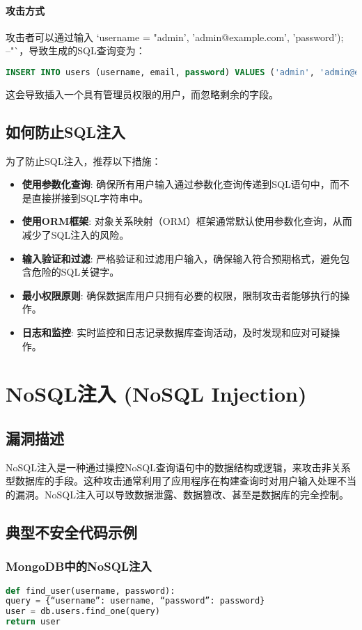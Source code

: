 \documentclass{article}
\begin{document}
\paragraph{攻击方式}
攻击者可以通过输入 `username = "admin', 'admin@example.com', 'password'); --"`，导致生成的SQL查询变为：
\begin{lstlisting}[language=SQL]
INSERT INTO users (username, email, password) VALUES ('admin', 'admin@example.com', 'password'); --', '', '')
\end{lstlisting}
这会导致插入一个具有管理员权限的用户，而忽略剩余的字段。

\subsection{如何防止SQL注入}
为了防止SQL注入，推荐以下措施：
\begin{itemize}
\item \textbf{使用参数化查询}: 确保所有用户输入通过参数化查询传递到SQL语句中，而不是直接拼接到SQL字符串中。
\item \textbf{使用ORM框架}: 对象关系映射（ORM）框架通常默认使用参数化查询，从而减少了SQL注入的风险。
\item \textbf{输入验证和过滤}: 严格验证和过滤用户输入，确保输入符合预期格式，避免包含危险的SQL关键字。
\item \textbf{最小权限原则}: 确保数据库用户只拥有必要的权限，限制攻击者能够执行的操作。
\item \textbf{日志和监控}: 实时监控和日志记录数据库查询活动，及时发现和应对可疑操作。
\end{itemize}

\section{NoSQL注入 (NoSQL Injection)}

\subsection{漏洞描述}
NoSQL注入是一种通过操控NoSQL查询语句中的数据结构或逻辑，来攻击非关系型数据库的手段。这种攻击通常利用了应用程序在构建查询时对用户输入处理不当的漏洞。NoSQL注入可以导致数据泄露、数据篡改、甚至是数据库的完全控制。

\subsection{典型不安全代码示例}

\subsubsection{MongoDB中的NoSQL注入}
\begin{lstlisting}[language=Python, caption=存在NoSQL注入漏洞的代码]
def find_user(username, password):
query = {“username”: username, “password”: password}
user = db.users.find_one(query)
return user
\end{lstlisting}
\end{document}
